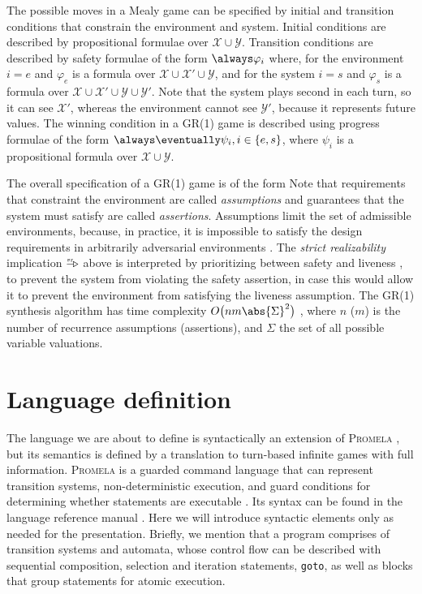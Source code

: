 \documentclass[copyright]{eptcs}
\makeatletter
\def\tla@while{-\hspace{-.18em}\triangleright}
\def\strictarrow{\stackrel{\mbox{\raisebox{-.3em}[0pt][0pt]{$\scriptscriptstyle\mathrm{sr}\;\,$}}}{\tla@while}}
\makeatother
\begin{document}
The possible moves in a Mealy game can be specified by initial and transition conditions that constrain the environment and system.
Initial conditions are described by propositional formulae over $\mathcal{X} \cup \mathcal{Y}$.
Transition conditions are described by safety formulae of the form $\always \varphi_i$ where, for the environment $i=e$ and $\varphi_e$ is a formula over $\mathcal{X} \cup \mathcal{X}' \cup \mathcal{Y}$, and for the system $i=s$ and $\varphi_s$ is a formula over $\mathcal{X} \cup \mathcal{X}' \cup \mathcal{Y} \cup \mathcal{Y}'$.
Note that the system plays second in each turn, so it can see $\mathcal{X}'$, whereas the environment cannot see $\mathcal{Y}'$, because it represents future values.
The winning condition in a GR(1) game is described using progress formulae of the form $\always \eventually \psi_i, i \in \{e, s\}$, where $\psi_i$ is a propositional formula over $\mathcal{X} \cup \mathcal{Y}$.

The overall specification of a GR(1) game is of the form
\myeq{
	\Big(
		\underbrace{
			\theta_e \wedge
			\always \varphi_e \wedge
			\bigwedge_{ i = 0 }^{ n - 1 }
				\always \eventually \psi_{e, i}
		}_{assumption}
	\Big)
		\strictarrow
	\Big(
		\underbrace{
			\theta_s \wedge
			\always \varphi_s \wedge
			\bigwedge_{ j = 0 }^{ m - 1 }
				\always \eventually \psi_{s, j}
		}_{assertion}
	\Big)
}
Note that requirements that constraint the environment are called {\em assumptions} and guarantees that the system must satisfy are called {\em assertions}.
Assumptions limit the set of admissible environments, because, in practice, it is impossible to satisfy the design requirements in arbitrarily adversarial environments \cite{Abadi94podc}.
The {\em strict realizability} implication $\strictarrow$ above is interpreted by prioritizing between safety and liveness \cite{Bloem12jcss}, to prevent the system from violating the safety assertion, in case this would allow it to prevent the environment from satisfying the liveness assumption.
The GR(1) synthesis algorithm has time complexity $O\big(n m \abs{\Sigma}^2\big)$ \cite{Bloem12jcss},
where $n$ ($m$) is the number of recurrence assumptions (assertions),
and $\Sigma$ the set of all possible variable valuations.
\clearpage{}
\clearpage{}\section{Language definition}

The language we are about to define is syntactically an extension of \textsc{Promela} \cite{Holzmann03}, but its semantics is defined by a translation to turn-based infinite games with full information.
\textsc{Promela} is a guarded command language that can represent transition systems, non-deterministic execution, and guard conditions for determining whether statements are executable \cite{Holzmann03,Dijkstra75cacm}.
Its syntax can be found in the language reference manual \cite{Holzmann03,spinroot}.
Here we will introduce syntactic elements only as needed for the presentation.
Briefly, we mention that a program comprises of transition systems and automata, whose control flow can be described with sequential composition, selection and iteration statements, \texttt{goto}, as well as blocks that group statements for atomic execution.
\end{document}
